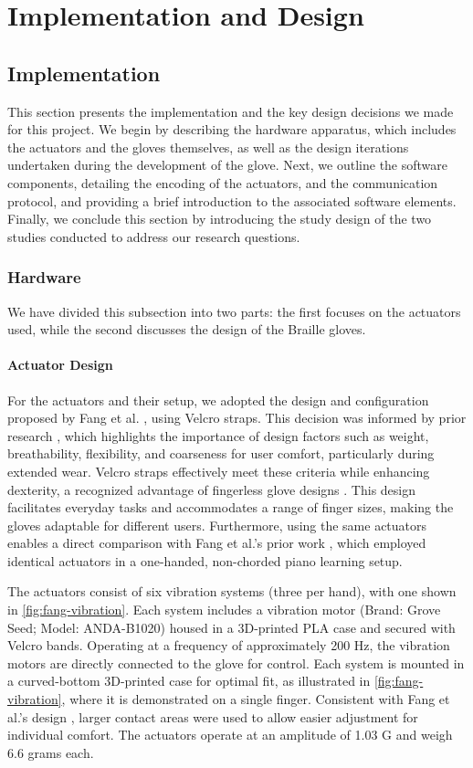 \chapter{Implementation and Design}
\label{ch:Implementation}

\section{Implementation}
This section presents the implementation and the key design decisions we made for this project.
We begin by describing the hardware apparatus, which includes the actuators and the gloves themselves, as well as the design iterations undertaken during the development of the glove.
Next, we outline the software components, detailing the encoding of the actuators, and the communication protocol, and providing a brief introduction to the associated software elements.
Finally, we conclude this section by introducing the study design of the two studies conducted to address our research questions.


\subsection{Hardware}
We have divided this subsection into two parts: the first focuses on the actuators used, while the second discusses the design of the Braille gloves.

\subsubsection{Actuator Design}
For the actuators and their setup, we adopted the design and configuration proposed by Fang et al. \cite{Fang2023}, using Velcro straps. This decision was informed by prior research \cite{Markow2010, Kohlsdorf2010, Huang2010, Fang2023a}, which highlights the importance of design factors such as weight, breathability, flexibility, and coarseness for user comfort, particularly during extended wear. Velcro straps effectively meet these criteria while enhancing dexterity, a recognized advantage of fingerless glove designs \cite{Huang2008}. This design facilitates everyday tasks and accommodates a range of finger sizes, making the gloves adaptable for different users. Furthermore, using the same actuators enables a direct comparison with Fang et al.’s prior work \cite{Fang2023}, which employed identical actuators in a one-handed, non-chorded piano learning setup.

The actuators consist of six vibration systems (three per hand), with one shown in \autoref{fig:fang-vibration}. Each system includes a vibration motor (Brand: Grove Seed; Model: ANDA-B1020) housed in a 3D-printed PLA case and secured with Velcro bands. Operating at a frequency of approximately 200 Hz, the vibration motors are directly connected to the glove for control. Each system is mounted in a curved-bottom 3D-printed case for optimal fit, as illustrated in \autoref{fig:fang-vibration}, where it is demonstrated on a single finger. Consistent with Fang et al.’s design \cite{Fang2023}, larger contact areas were used to allow easier adjustment for individual comfort. The actuators operate at an amplitude of 1.03 G and weigh 6.6 grams each.

